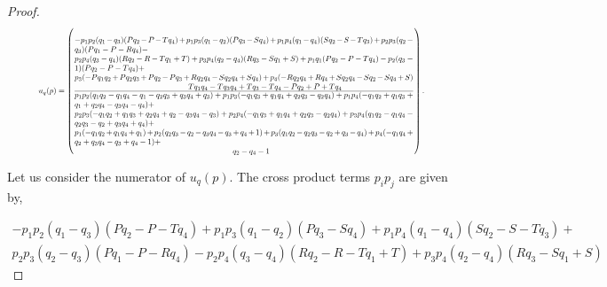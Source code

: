 \begin{proof}
\begingroup
\scriptsize
\begin{equation*}
    \resizebox{0.91\hsize}{!}{
    $u_q(p) = \left(
    \frac
        {\parbox{6in}{$ - p_{1} p_{2} (q_{1} - q_{3}) (P q_{2} - P - T q_{4}) + p_{1} p_{3} (q_{1} - q_{2}) (P q_{3} - S q_{4}) + p_{1} p_{4} (q_{1} - q_{4}) (S q_{2} - S - T q_{3}) + p_{2} p_{3} (q_{2} - q_{3}) (P q_{1} - P - R q_{4}) - $ \\
        $ p_{2} p_{4} (q_{3} - q_{4}) (R q_{2} - R - T q_{1} + T) + p_{3} p_{4} (q_{2} - q_{4}) (R q_{3} - S q_{1} + S) + p_{1} q_{1} (P q_{2} - P - T q_{4}) - p_{2} (q_{3} - 1) (P q_{2} - P - T q_{4}) + $ \\
        $ p_{3} (- P q_{1} q_{2} + P q_{2} q_{3} + P q_{2} - P q_{3} + R q_{2} q_{4} - S q_{2} q_{4} + S q_{4}) + p_{4} (- R q_{2} q_{4} + R q_{4} + S q_{2} q_{4} - S q_{2} - S q_{4} + S ) $ \\
        \hspace*{5cm} $ T q_{1} q_{4} - T q_{3} q_{4} + T q_{3} - T q_{4} - P q_{2} + P + T q_{4}$
        }}
        {\parbox{6in}{$
        p_{1} p_{2} (q_{1} q_{2} - q_{1} q_{4} - q_{1} - q_{2} q_{3} + q_{3} q_{4} + q_{3}) + p_{1} p_{3} (- q_{1} q_{3} + q_{1} q_{4} + q_{2} q_{3} - q_{2} q_{4}) + p_{1} p_{4} (- q_{1} q_{2} + q_{1} q_{3} + q_{1} + q_{2} q_{4} - q_{3} q_{4} - q_{4}) +$ \\
        $ p_{2} p_{3} (- q_{1} q_{2} + q_{1} q_{3} + q_{2} q_{4} + q_{2} - q_{3} q_{4} - q_{3}) + p_{2} p_{4} (- q_{1} q_{3} + q_{1} q_{4} + q_{2} q_{3} - q_{2} q_{4}) + p_{3} p_{4} (q_{1} q_{2} - q_{1} q_{4} - q_{2} q_{3} - q_{2} + q_{3} q_{4} + q_{4}) + $ \\
        $ p_{1} (- q_{1} q_{2} + q_{1} q_{4} + q_{1}) + p_{2} (q_{2} q_{3} - q_{2} - q_{3} q_{4} - q_{3} + q_{4} + 1) + p_{3} (q_{1} q_{2} - q_{2} q_{3} - q_{2} + q_{3} - q_{4}) + p_{4} (- q_{1} q_{4} + q_{2} + q_{3} q_{4} - q_{3} + q_{4} - 1) + $ \\
        \hspace*{7cm} $q_{2} - q_{4} - 1$
    }}
    \right).$}
\end{equation*}
    \endgroup

Let us consider the numerator of \(u_q(p)\). The cross product terms
\(p_ip_j\) are given by,

\begingroup
\footnotesize
\begin{align*}
- p_{1} p_{2} (q_{1} - q_{3}) (P q_{2} - P - T q_{4}) + p_{1} p_{3} (q_{1} - q_{2}) (P q_{3} - S q_{4}) + p_{1} p_{4} (q_{1} - q_{4}) (S q_{2} - S - T q_{3}) + \\
p_{2} p_{3} (q_{2} - q_{3}) (P q_{1} - P - R q_{4}) - p_{2} p_{4} (q_{3} - q_{4}) (R q_{2} - R - T q_{1} + T) + p_{3} p_{4} (q_{2} - q_{4}) (R q_{3} - S q_{1} + S)
\end{align*}
\endgroup


\end{proof}
